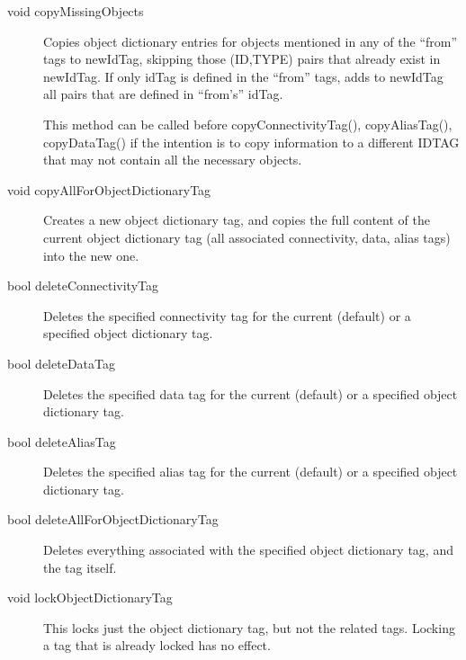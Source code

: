 \begin{description}
\item[void copyMissingObjects]

Copies object dictionary entries for objects mentioned in any of the
``from'' tags to newIdTag, skipping those (ID,TYPE) pairs that already
exist in newIdTag.  If only idTag is defined in the ``from'' tags,
adds to newIdTag all pairs that are defined in ``from's'' idTag.

This method can be called before copyConnectivityTag(),
copyAliasTag(), copyDataTag() if the intention is to copy information
to a different IDTAG that may not contain all the necessary objects.

\item[void copyAllForObjectDictionaryTag]
Creates a new object dictionary tag, and copies the full content of
the current object dictionary tag (all associated connectivity, data,
alias tags) into the new one.

\item[bool deleteConnectivityTag]
Deletes the specified connectivity tag for the current (default) or a
specified object dictionary tag.

\item[bool deleteDataTag]
Deletes the specified data tag for the current (default) or a
specified object dictionary tag.

\item[bool deleteAliasTag]
Deletes the specified alias tag for the current (default) or a
specified object dictionary tag.

\item[bool deleteAllForObjectDictionaryTag]
Deletes everything associated with the specified object dictionary
tag, and the tag itself.


\item[void lockObjectDictionaryTag] This
  locks just the object dictionary tag, but not the related tags.
  Locking a tag that is already locked has no effect.


\end{description}
